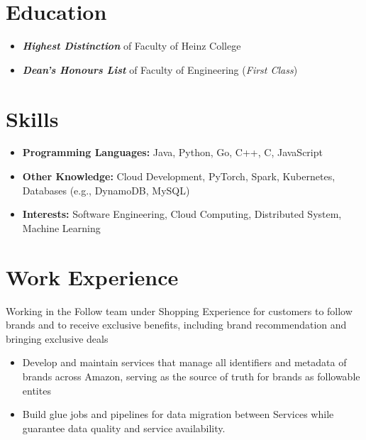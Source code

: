 \documentclass{resume}
\begin{document}



\section{Education}
\begin{itemize}[parsep=0.5ex]
  \item \textbf{\textit{Highest Distinction}} of Faculty of Heinz College
\end{itemize}
\begin{itemize}[parsep=0.5ex]
  \item \textbf{\textit{Dean's Honours List}} of Faculty of Engineering (\textit{First Class})
\end{itemize}

\section{Skills}
\begin{itemize}[parsep=0.5ex]
  \item \textbf{Programming Languages:} Java, Python, Go, C++, C, JavaScript
  \item \textbf{Other Knowledge:} Cloud Development, PyTorch, Spark, Kubernetes, Databases (e.g., DynamoDB, MySQL)
  \item \textbf{Interests:} Software Engineering, Cloud Computing, Distributed System, Machine Learning
\end{itemize}

\section{Work Experience}
\begin{flushleft}
Working in the Follow team under Shopping Experience for customers to follow brands and to receive exclusive benefits, including brand recommendation and bringing exclusive deals
\begin{itemize}
  \item Develop and maintain services that manage all identifiers and metadata of brands across Amazon, serving as the source of truth for brands as followable entites
  \item Build glue jobs and pipelines for data migration between Services while guarantee data quality and service availability.
\end{itemize}
\end{flushleft}
\end{document}
